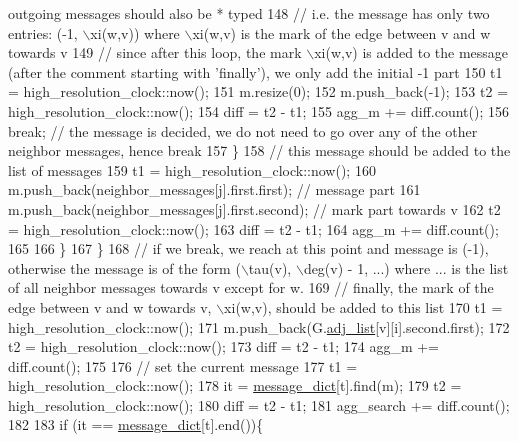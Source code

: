 \begin{DoxyCode}
{       outgoing messages should also be * typed}
148                 \textcolor{comment}{// i.e. the message has only two entries: (-1, \(\backslash\)xi(w,v)) where \(\backslash\)xi(w,v) is the mark of the
       edge between v and w towards v}
149                 \textcolor{comment}{// since after this loop, the mark \(\backslash\)xi(w,v) is added to the message (after the comment
       starting with 'finally'), we only add the initial -1 part}
150                 t1 = high\_resolution\_clock::now();
151                 m.resize(0);
152                 m.push\_back(-1);
153                 t2 = high\_resolution\_clock::now();
154                 diff = t2 - t1;
155                 agg\_m += diff.count();
156                 \textcolor{keywordflow}{break}; \textcolor{comment}{// the message is decided, we do not need to go over any of the other neighbor
       messages, hence break}
157               \}
158               \textcolor{comment}{// this message should be added to the list of messages}
159               t1 = high\_resolution\_clock::now();
160               m.push\_back(neighbor\_messages[j].first.first); \textcolor{comment}{// message part}
161               m.push\_back(neighbor\_messages[j].first.second); \textcolor{comment}{// mark part towards v}
162               t2 = high\_resolution\_clock::now();
163               diff = t2 - t1;
164               agg\_m += diff.count();
165 
166             \}
167           \}
168           \textcolor{comment}{// if we break, we reach at this point and message is (-1), otherwise the message is of the form
       (\(\backslash\)tau(v), \(\backslash\)deg(v) - 1, ...) where ... is the list of all neighbor messages towards v except for w. }
169           \textcolor{comment}{// finally, the mark of the edge between v and w towards v, \(\backslash\)xi(w,v), should be added to this
       list}
170           t1 = high\_resolution\_clock::now();
171           m.push\_back(G.\hyperlink{classmarked__graph_a1a0bf7ca413a278763f7c878b3b6fd6f}{adj\_list}[v][i].second.first);
172           t2 = high\_resolution\_clock::now();
173           diff = t2 - t1;
174           agg\_m += diff.count();
175 
176           \textcolor{comment}{// set the current message}
177           t1 = high\_resolution\_clock::now();
178           it = \hyperlink{classgraph__message_ab54d89b122c2b1322da0d5db2043fb84}{message\_dict}[t].find(m);
179           t2 = high\_resolution\_clock::now();
180           diff = t2 - t1;
181           agg\_search += diff.count();
182 
183           \textcolor{keywordflow}{if} (it == \hyperlink{classgraph__message_ab54d89b122c2b1322da0d5db2043fb84}{message\_dict}[t].end())\{

\end{DoxyCode}
